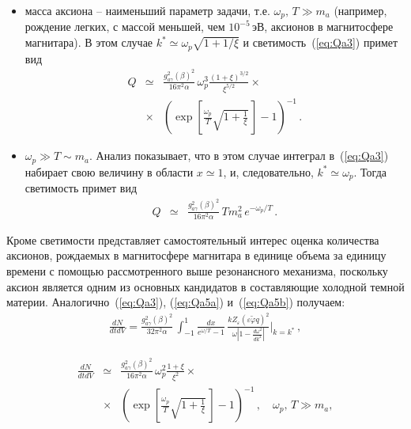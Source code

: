\begin{itemize} 

\item масса аксиона --  наименьший параметр задачи, т.е. 
$\omega_p, \,T \gg m_a$ (например, рождение легких, с массой меньшей, чем 
$10^{-5}$\,эВ, аксионов в магнитосфере
магнитара).  %
В этом случае 
$k^* \simeq \omega_p \sqrt{1+1/\xi}$ и светимость~(\ref{eq:Qa3}) примет вид
%
\begin{eqnarray}
\label{eq:Qa5a}
Q &\simeq&  \frac{g_{a\gamma}^2 (\beta)^2}{16 \pi^2 \alpha} \,
\omega_p^3 \frac{(1+\xi)^{3/2}}{\xi^{5/2}}\times
\\
\nonumber 
&\times& \left (\exp{\left [\frac{\omega_p}{T} 
\sqrt{1+\frac{1}{\xi}}\, \right ]}-1 \right )^{-1} \, .
\end{eqnarray}
%


\item $\omega_p \gg T \sim m_a$. Анализ показывает, что в этом 
случае интеграл в~(\ref{eq:Qa3}) набирает
свою величину в области $x\simeq 1$, и, следовательно, $k^* \simeq \omega_p $.
  Тогда светимость примет вид
%
\begin{eqnarray}
\label{eq:Qa5b}
Q &\simeq&  \frac{g_{a\gamma}^2 (\beta)^2}{16 \pi^2 \alpha} \, T m_a^2  \, 
e^{-\omega_p/T} \, .
\end{eqnarray}
%

\end{itemize}

Кроме светимости представляет самостоятельный интерес оценка количества аксионов,
рождаемых в магнитосфере магнитара в единице объема за единицу времени с 
помощью рассмотренного выше резонансного
механизма, поскольку аксион является одним из основных кандидатов в составляющие
холодной темной материи. Аналогично~(\ref{eq:Qa3}), (\ref{eq:Qa5a}) 
и~(\ref{eq:Qa5b}) получаем: 
%
\begin{eqnarray}
\frac{dN}{dt dV} =  \frac{g_{a\gamma}^2 (\beta)^2}{32 \pi^2 \alpha} \, 
\int_{-1}^1 \frac{dx}{e^{\omega/T}-1} \, 
\frac{k Z_{\varepsilon} 
(\varepsilon \tilde \varphi q)^2}{\omega 
\left |1-\frac{d\omega^2}{dk^2}\right |}\bigg |_{k=k^*}\, ,
\label{eq:Na0}
\end{eqnarray}
%

%
\begin{eqnarray}
\label{eq:Na1}
\frac{dN}{dt dV} &\simeq&  \frac{g_{a\gamma}^2 (\beta)^2}{16 \pi^2 \alpha} \,
\omega_p^2 \frac{1+\xi}{\xi^{2}}\times
\\
\nonumber 
&\times& \left (\exp{\left [\frac{\omega_p}{T} 
\sqrt{1+\frac{1}{\xi}}\, \right ]}-1 \right )^{-1} \, , \quad \omega_p,\, T \gg m_a,
\end{eqnarray}
%


